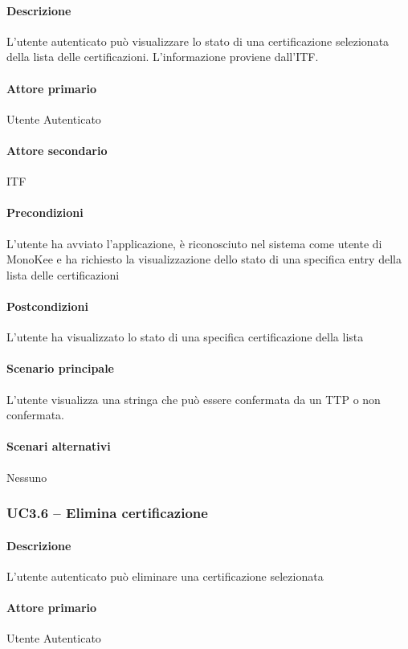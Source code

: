 \paragraph{Descrizione}  L’utente autenticato può visualizzare lo stato di una certificazione selezionata della lista delle certificazioni. L’informazione proviene dall’ITF.
\paragraph{Attore primario}  Utente Autenticato
\paragraph{Attore secondario}  ITF
\paragraph{Precondizioni} L’utente ha avviato l’applicazione, è riconosciuto nel sistema come utente di MonoKee e ha richiesto la visualizzazione dello stato di una specifica entry della lista delle certificazioni
\paragraph{Postcondizioni}  L’utente ha visualizzato lo stato di una specifica certificazione della lista
\paragraph{Scenario principale}  
L’utente visualizza una stringa che può essere confermata da un TTP o non confermata.
\paragraph{Scenari alternativi}  Nessuno



\subsubsection{UC3.6 – Elimina certificazione}
\paragraph{Descrizione}  L’utente autenticato può eliminare una certificazione selezionata
\paragraph{Attore primario}  Utente Autenticato
